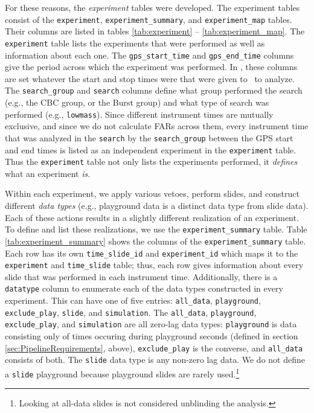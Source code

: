 For these reasons, the \emph{experiment} tables were developed. The experiment
tables consist of the \texttt{experiment}, \texttt{experiment\_summary}, and
\texttt{experiment\_map} tables. Their columns are listed in tables
\ref{tab:experiment} -- \ref{tab:experiment_map}. The \texttt{experiment} table
lists the experiments that were performed as well as information about each
one. The \texttt{gps\_start\_time} and \texttt{gps\_end\_time} columns give the
period across which the experiment was performed. In \ihope, these columns are
set whatever the start and stop times were that were given to \ihope~to
analyze. The \texttt{search\_group} and \texttt{search} columns define what
group performed the search (e.g., the \ac{CBC} group, or the Burst group) and
what type of search was performed (e.g., \texttt{lowmass}). Since different
instrument times are mutually exclusive, and since we do not calculate
\acp{FAR} across them, every instrument time that was analyzed in the
\texttt{search} by the \texttt{search\_group} between the GPS start and end
times is listed as an independent experiment in the \texttt{experiment} table.
Thus the \texttt{experiment} table not only lists the experiments performed, it
\emph{defines} what an experiment \emph{is}.

Within each experiment, we apply various vetoes, perform slides, and construct
different \emph{data types} (e.g., playground data is a distinct data type from
slide data). Each of these actions results in a slightly different realization
of an experiment. To define and list these realizations, we use the
\texttt{experiment\_summary} table. Table \ref{tab:experiment_summary} shows
the columns of the \texttt{experiment\_summary} table. Each row has its own
\texttt{time\_slide\_id} and \texttt{experiment\_id} which maps it to the
\texttt{experiment} and \texttt{time\_slide} table; thus, each row gives
information about every slide that was performed in each instrument time.
Additionally, there is a \texttt{datatype} column to enumerate each of the data
types constructed in every experiment. This can have one of five entries:
\texttt{all\_data}, \texttt{playground}, \texttt{exclude\_play},
\texttt{slide}, and \texttt{simulation}. The \texttt{all\_data},
\texttt{playground}, \texttt{exclude\_play}, and \texttt{simulation} are all
zero-lag data types: \texttt{playground} is data consisting only of times
occuring during playground seconds (defined in section
\ref{sec:PipelineRequirements}, above), \texttt{exclude\_play} is the converse,
and \texttt{all\_data} consists of both. The \texttt{slide} data type is any
non-zero lag data. We do not define a \texttt{slide} playground because
playground slides are rarely used.\footnote{Looking at all-data slides is not
considered unblinding the analysis.}

